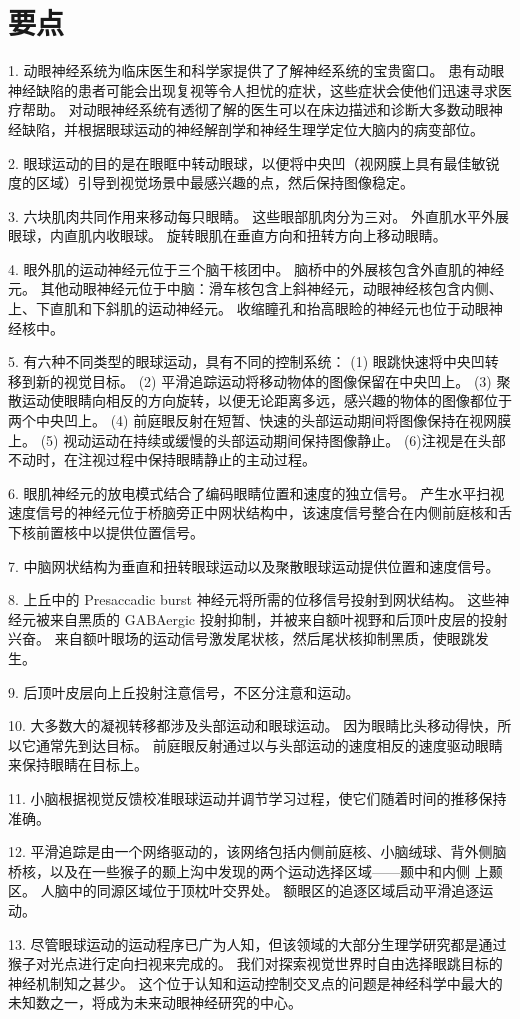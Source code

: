 \section{要点}

1. 动眼神经系统为临床医生和科学家提供了了解神经系统的宝贵窗口。
患有动眼神经缺陷的患者可能会出现复视等令人担忧的症状，这些症状会使他们迅速寻求医疗帮助。
对动眼神经系统有透彻了解的医生可以在床边描述和诊断大多数动眼神经缺陷，并根据眼球运动的神经解剖学和神经生理学定位大脑内的病变部位。


2. 眼球运动的目的是在眼眶中转动眼球，以便将中央凹（视网膜上具有最佳敏锐度的区域）引导到视觉场景中最感兴趣的点，然后保持图像稳定。


3. 六块肌肉共同作用来移动每只眼睛。
这些眼部肌肉分为三对。
外直肌水平外展眼球，内直肌内收眼球。
旋转眼肌在垂直方向和扭转方向上移动眼睛。


4. 眼外肌的运动神经元位于三个脑干核团中。
脑桥中的外展核包含外直肌的神经元。
其他动眼神经元位于中脑：滑车核包含上斜神经元，动眼神经核包含内侧、上、下直肌和下斜肌的运动神经元。
收缩瞳孔和抬高眼睑的神经元也位于动眼神经核中。


5. 有六种不同类型的眼球运动，具有不同的控制系统： (1) 眼跳快速将中央凹转移到新的视觉目标。
(2) 平滑追踪运动将移动物体的图像保留在中央凹上。
(3) 聚散运动使眼睛向相反的方向旋转，以便无论距离多远，感兴趣的物体的图像都位于两个中央凹上。
(4) 前庭眼反射在短暂、快速的头部运动期间将图像保持在视网膜上。
(5) 视动运动在持续或缓慢的头部运动期间保持图像静止。
(6)注视是在头部不动时，在注视过程中保持眼睛静止的主动过程。


6. 眼肌神经元的放电模式结合了编码眼睛位置和速度的独立信号。
产生水平扫视速度信号的神经元位于桥脑旁正中网状结构中，该速度信号整合在内侧前庭核和舌下核前置核中以提供位置信号。


7. 中脑网状结构为垂直和扭转眼球运动以及聚散眼球运动提供位置和速度信号。


8. 上丘中的 Presaccadic burst 神经元将所需的位移信号投射到网状结构。
这些神经元被来自黑质的 GABAergic 投射抑制，并被来自额叶视野和后顶叶皮层的投射兴奋。
来自额叶眼场的运动信号激发尾状核，然后尾状核抑制黑质，使眼跳发生。


9. 后顶叶皮层向上丘投射注意信号，不区分注意和运动。


10. 大多数大的凝视转移都涉及头部运动和眼球运动。
因为眼睛比头移动得快，所以它通常先到达目标。
前庭眼反射通过以与头部运动的速度相反的速度驱动眼睛来保持眼睛在目标上。


11. 小脑根据视觉反馈校准眼球运动并调节学习过程，使它们随着时间的推移保持准确。


12. 平滑追踪是由一个网络驱动的，该网络包括内侧前庭核、小脑绒球、背外侧脑桥核，以及在一些猴子的颞上沟中发现的两个运动选择区域——颞中和内侧 上颞区。
人脑中的同源区域位于顶枕叶交界处。
额眼区的追逐区域启动平滑追逐运动。


13. 尽管眼球运动的运动程序已广为人知，但该领域的大部分生理学研究都是通过猴子对光点进行定向扫视来完成的。
我们对探索视觉世界时自由选择眼跳目标的神经机制知之甚少。
这个位于认知和运动控制交叉点的问题是神经科学中最大的未知数之一，将成为未来动眼神经研究的中心。




